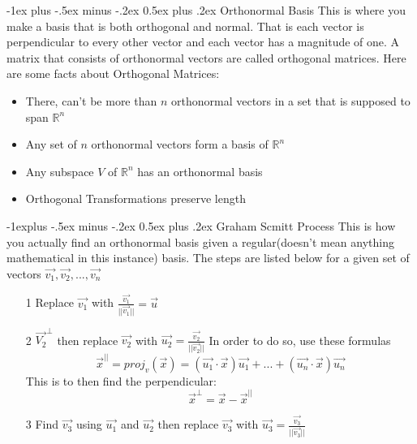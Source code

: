 \documentclass[10pt,landscape]{article}
\makeatletter
\renewcommand{\section}{\@startsection{section}{1}{0mm}%
                                {-1ex plus -.5ex minus -.2ex}%
                                {0.5ex plus .2ex}%
                                {\normalfont\large\bfseries}}
\renewcommand{\subsection}{\@startsection{subsection}{2}{0mm}%
                                {-1explus -.5ex minus -.2ex}%
                                {0.5ex plus .2ex}%
                                {\normalfont\normalsize\bfseries}}
\makeatother
\begin{document}
\begin{multicols}{3}
\section{Orthonormal Basis}
This is where you make a basis that is both orthogonal and normal. That is each vector is perpendicular to every other vector and each vector has a magnitude of one. A matrix that consists of orthonormal vectors are called orthogonal matrices. Here are some facts about Orthogonal Matrices:
\begin{itemize}
    \item There, can't be more than $n$ orthonormal vectors in a set that is supposed to span $\mathbb{R}^n$
    \item Any set of $n$ orthonormal vectors form a basis of $\mathbb{R}^n$
    \item Any subspace $V$ of $\mathbb{R}^n$ has an orthonormal basis
    \item Orthogonal Transformations preserve length
\end{itemize}{}

\subsection{Graham Scmitt Process}
This is how you actually find an orthonormal basis given a regular(doesn't mean anything mathematical in this instance) basis. The steps are listed below for a given set of vectors $\vec{v_1},\vec{v_2},..., \vec{v_n}$
\begin{itemize}
    \item[1] Replace $\vec{v_1}$ with $\frac{\vec{v_1}}{||\vec{v_1}||}=\vec{u}$
    \item[2] $\vec{V_2}^{\perp} $ then replace $\vec{v_2}$ with $\vec{u_2}=\frac{\vec{v_2}}{||\vec{v_2}||}$ In order to do so, use these formulas
    \begin{equation*}
        \vec{x}^{||}=proj_v(\vec{x})=(\vec{u_1} \cdot \vec{x})\vec{u_1}+...+(\vec{u_n} \cdot \vec{x})\vec{u_n}
    \end{equation*}{}
    This is to then find the perpendicular:
    \begin{equation*}
        \vec{x}^{\perp}=\vec{x}-\vec{x}^{||}
    \end{equation*}{}
    \item[3] Find $\vec{v_3}$ using $\vec{u_1}$ and $\vec{u_2}$ then replace $\vec{v_3}$ with $\vec{u_3}=\frac{\vec{v_3}}{||\vec{v_3}||}$
\end{itemize}{}


\end{multicols}
\end{document}
